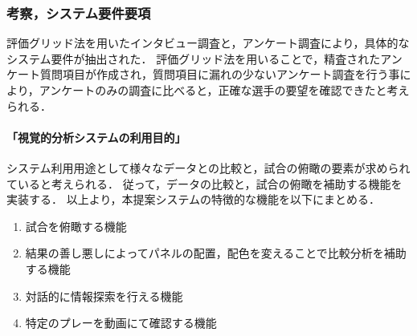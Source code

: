 \documentclass[sotsuron]{kuee}
\begin{document}
			\subsubsection{考察，システム要件要項}
				評価グリッド法を用いたインタビュー調査と，アンケート調査により，具体的なシステム要件が抽出された．
				評価グリッド法を用いることで，精査されたアンケート質問項目が作成され，質問項目に漏れの少ないアンケート調査を行う事により，アンケートのみの調査に比べると，正確な選手の要望を確認できたと考えられる．
					\paragraph {「視覚的分析システムの利用目的」}
						システム利用用途として様々なデータとの比較と，試合の俯瞰の要素が求められていると考えられる．
						従って，データの比較と，試合の俯瞰を補助する機能を実装する．
						以上より，本提案システムの特徴的な機能を以下にまとめる．
						\begin{enumerate}	
							\item 試合を俯瞰する機能
							\item 結果の善し悪しによってパネルの配置，配色を変えることで比較分析を補助する機能
							\item 対話的に情報探索を行える機能
							\item 特定のプレーを動画にて確認する機能
						\end{enumerate}
\end{document}

